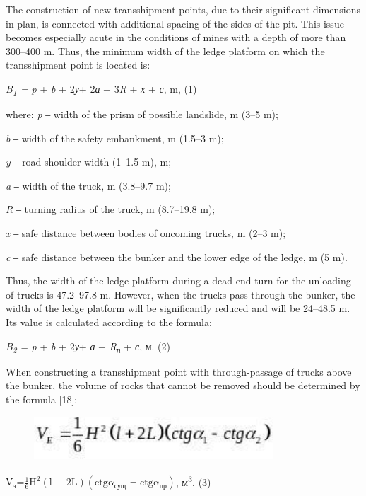 The construction of new transshipment points, due to their significant
dimensions in plan, is connected with additional spacing of the sides of
the pit. This issue becomes especially acute in the conditions of mines
with a depth of more than 300--400 m. Thus, the minimum width of the
ledge platform on which the transshipment point is located is:

\emph{B\textsubscript{1} = p} + \emph{b} + 2\emph{у}+ 2\emph{а} +
3\emph{R} + \emph{х} + \emph{с}, m, (1)

where: \emph{p} ‒ width of the prism of possible landslide, m (3--5 m);

\emph{b} ‒ width of the safety embankment, m (1.5--3 m);

\emph{y} ‒ road shoulder width (1--1.5 m), m;

\emph{a} ‒ width of the truck, m (3.8--9.7 m);

\emph{R} ‒ turning radius of the truck, m (8.7--19.8 m);

\emph{x} ‒ safe distance between bodies of oncoming trucks, m (2--3 m);

\emph{c} ‒ safe distance between the bunker and the lower edge of the
ledge, m (5 m).

Thus, the width of the ledge platform during a dead-end turn for the
unloading of trucks is 47.2--97.8 m. However, when the trucks pass
through the bunker, the width of the ledge platform will be
significantly reduced and will be 24--48.5 m. Its value is calculated
according to the formula:

\emph{B\textsubscript{2} = p} + \emph{b} + 2\emph{у}+ \emph{а} +
\emph{R\textsubscript{п}} + \emph{с}, м. (2)

When constructing a transshipment point with through-passage of trucks
above the bunker, the volume of rocks that cannot be removed should be
determined by the formula {[}18{]}:

\begin{figure}[H]
	\centering
	\includegraphics[width=0.8\textwidth]{assets/1355}
	\caption*{}
\end{figure}\(\text{V}_{\text{э}}\text{=}\frac{\text{1}}{\text{6}}\text{H}^{\text{2}}\left( \text{l + 2L} \right)\left( \text{ctg}\text{α}_{\text{сущ}}\text{ ‒ ctg}\text{α}_{\text{пр}} \right)\),
м\textsuperscript{3}, (3)

